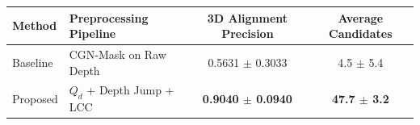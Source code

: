 \begin{tabular}{llcc}
\hline
Method & Preprocessing Pipeline & 3D Alignment Precision & Average Candidates \\
\hline
Baseline & CGN-Mask on Raw Depth & 0.5631 $\pm$ 0.3033 & 4.5 $\pm$ 5.4 \\
Proposed & $Q_d$ + Depth Jump + LCC & \textbf{0.9040 $\pm$ 0.0940} & \textbf{47.7 $\pm$ 3.2} \\
\hline
\end{tabular}
